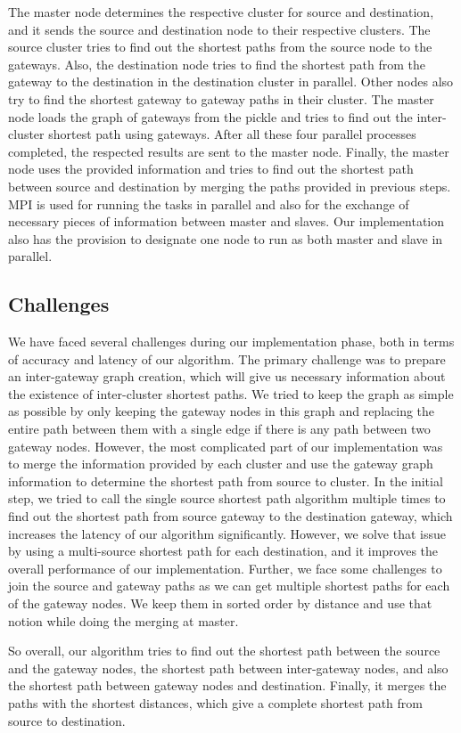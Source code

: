 The master node determines the respective cluster for source and destination, and it sends the source and destination node to their respective clusters. The source cluster tries to find out the shortest paths from the source node to the gateways. Also, the destination node tries to find the shortest path from the gateway to the destination in the destination cluster in parallel. Other nodes also try to find the shortest gateway to gateway paths in their cluster. The master node loads the graph of gateways from the pickle and tries to find out the inter-cluster shortest path using gateways. After all these four parallel processes completed, the respected results are sent to the master node. Finally, the master node uses the provided information and tries to find out the shortest path between source and destination by merging the paths provided in previous steps. MPI is used for running the tasks in parallel and also for the exchange of necessary pieces of information between master and slaves. Our implementation also has the provision to designate one node to run as both master and slave in parallel.

\subsection{Challenges}
We have faced several challenges during our implementation phase, both in terms of accuracy and latency of our algorithm. The primary challenge was to prepare an inter-gateway graph creation, which will give us necessary information about the existence of inter-cluster shortest paths. We tried to keep the graph as simple as possible by only keeping the gateway nodes in this graph and replacing the entire path between them with a single edge if there is any path between two gateway nodes. However, the most complicated part of our implementation was to merge the information provided by each cluster and use the gateway graph information to determine the shortest path from source to cluster. In the initial step, we tried to call the single source shortest path algorithm multiple times to find out the shortest path from source gateway to the destination gateway, which increases the latency of our algorithm significantly. However, we solve that issue by using a multi-source shortest path for each destination, and it improves the overall performance of our implementation. Further, we face some challenges to join the source and gateway paths as we can get multiple shortest paths for each of the gateway nodes. We keep them in sorted order by distance and use that notion while doing the merging at master.

So overall, our algorithm tries to find out the shortest path between the source and the gateway nodes, the shortest path between inter-gateway nodes, and also the shortest path between gateway nodes and destination. Finally, it merges the paths with the shortest distances, which give a complete shortest path from source to destination.